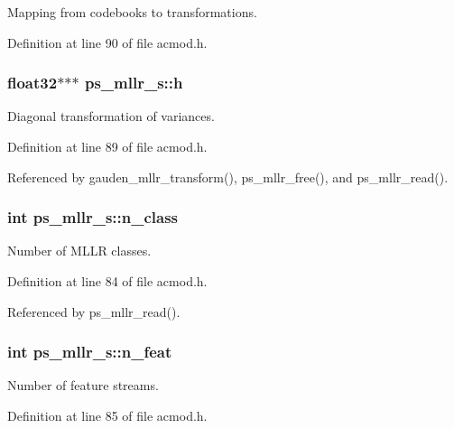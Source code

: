 Mapping from codebooks to transformations. 



Definition at line 90 of file acmod.\-h.

\subsubsection[{h}]{\setlength{\rightskip}{0pt plus 5cm}float32$\ast$$\ast$$\ast$ ps\-\_\-mllr\-\_\-s\-::h}\label{structps__mllr__s_ae92b910e17202389aca99ee5105085b0}


Diagonal transformation of variances. 



Definition at line 89 of file acmod.\-h.



Referenced by gauden\-\_\-mllr\-\_\-transform(), ps\-\_\-mllr\-\_\-free(), and ps\-\_\-mllr\-\_\-read().

\subsubsection[{n\-\_\-class}]{\setlength{\rightskip}{0pt plus 5cm}int ps\-\_\-mllr\-\_\-s\-::n\-\_\-class}\label{structps__mllr__s_a30b9bb76c5469542d531ead4ad1bdcb1}


Number of M\-L\-L\-R classes. 



Definition at line 84 of file acmod.\-h.



Referenced by ps\-\_\-mllr\-\_\-read().

\subsubsection[{n\-\_\-feat}]{\setlength{\rightskip}{0pt plus 5cm}int ps\-\_\-mllr\-\_\-s\-::n\-\_\-feat}\label{structps__mllr__s_acc9e853a333f4e79b24f3e5af0946e43}


Number of feature streams. 



Definition at line 85 of file acmod.\-h.



